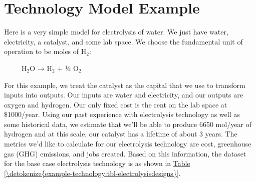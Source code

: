 \documentclass[letterpaper,10pt,english]{sphinxmanual}
\begin{document}
\sphinxstepscope


\chapter{Technology Model Example}
\label{\detokenize{example-technology:technology-model-example}}\label{\detokenize{example-technology:sec-techmodelexample}}\label{\detokenize{example-technology::doc}}
\sphinxAtStartPar
Here is a very simple model for electrolysis of water. We just have water, electricity, a catalyst, and some lab space. We choose the fundamental unit of operation to be moles of H$_{\text{2}}$:

\sphinxAtStartPar
     H$_{\text{2}}$O → H$_{\text{2}}$ + ½ O$_{\text{2}}$

\sphinxAtStartPar
For this example, we treat the catalyst as the capital that we use to transform inputs into outputs. Our inputs are water and electricity, and our outputs are oxygen and hydrogen. Our only fixed cost is the rent on the lab space at \$1000/year. Using our past experience with electrolysis technology as well as some historical data, we estimate that we’ll be able to produce 6650 mol/year of hydrogen and at this scale, our catalyst has a lifetime of about 3 years. The metrics we’d like to calculate for our electrolysis technology are cost, greenhouse gas (GHG) emissions, and jobs created. Based on this information, the  dataset for the base case electrolysis technology is as shown in \hyperref[\detokenize{example-technology:tbl-electrolysisdesigns}]{Table \ref{\detokenize{example-technology:tbl-electrolysisdesigns}}}.
\end{document}
